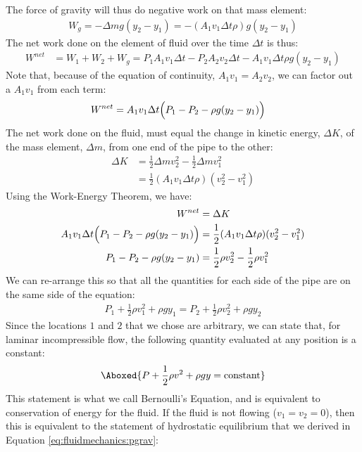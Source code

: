 {{The force of gravity will thus do negative work on that mass element:
\begin{align*}
W_g = -\Delta m g (y_2-y_1) = -(A_1 v_1 \Delta t \rho) g (y_2-y_1) 
\end{align*}
The net work done on the element of fluid over the time $\Delta t$ is thus:
\begin{align*}
W^{net} &= W_1+W_2+W_g = P_1A_1v_1 \Delta t - P_2A_2v_2 \Delta t -A_1 v_1 \Delta t \rho g (y_2-y_1) 
\end{align*}
Note that, because of the equation of continuity, $A_1v_1 = A_2 v_2$, we can factor out a $A_1v_1$ from each term:
\begin{align*}
W^{net} &=A_1v_1 \Delta t \Bigl(P_1- P_2 - \rho g (y_2-y_1)\Bigr) 
\end{align*}
The net work done on the fluid, must equal the change in kinetic energy, $\Delta K$, of the mass element, $\Delta m$, from one end of the pipe to the other:
\begin{align*}
\Delta K &= \frac{1}{2}\Delta m v_2^2 - \frac{1}{2}\Delta m v_1^2\\
&=\frac{1}{2}( A_1 v_1 \Delta t \rho) (v_2^2 - v_1^2)
\end{align*}
Using the Work-Energy Theorem, we have:
\begin{align*}
W^{net} &=\Delta K\\
A_1v_1 \Delta t \Bigl(P_1- P_2 - \rho g (y_2-y_1)\Bigr) &= \frac{1}{2}( A_1 v_1 \Delta t \rho) (v_2^2 - v_1^2)\\
P_1 - P_2 - \rho g (y_2-y_1)&= \frac{1}{2}\rho v_2^2 - \frac{1}{2}\rho v_1^2
\end{align*}
We can re-arrange this so that all the quantities for each side of the pipe are on the same side of the equation:
\begin{align*}
P_1 +\frac{1}{2}\rho v_1^2+ \rho g y_1= P_2 + \frac{1}{2}\rho v_2^2 + \rho g y_2
\end{align*}
Since the locations $1$ and $2$ that we chose are arbitrary, we can state that, for laminar incompressible flow, the following quantity evaluated at any position is a constant:
\begin{align}
\Aboxed{P +\frac{1}{2}\rho v^2+ \rho g y=\text{constant}}
\end{align}
This statement is what we call Bernoulli's Equation, and is equivalent to conservation of energy for the fluid. If the fluid is not flowing ($v_1=v_2=0$), then this is equivalent to the statement of hydrostatic equilibrium that we derived in Equation \ref{eq:fluidmechanics:pgrav}:
}}
